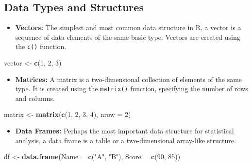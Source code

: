 \documentclass[
]{book}
\newenvironment{Shaded}{\begin{snugshade}}{\end{snugshade}}
\newcommand{\AttributeTok}[1]{\textcolor[rgb]{0.13,0.29,0.53}{#1}}
\newcommand{\DecValTok}[1]{\textcolor[rgb]{0.00,0.00,0.81}{#1}}
\newcommand{\FunctionTok}[1]{\textcolor[rgb]{0.13,0.29,0.53}{\textbf{#1}}}
\newcommand{\NormalTok}[1]{#1}
\newcommand{\OtherTok}[1]{\textcolor[rgb]{0.56,0.35,0.01}{#1}}
\newcommand{\StringTok}[1]{\textcolor[rgb]{0.31,0.60,0.02}{#1}}
\providecommand{\tightlist}{%
  \setlength{\itemsep}{0pt}\setlength{\parskip}{0pt}}
\begin{document}
\subsection*{Data Types and Structures}\label{data-types-and-structures}

\begin{itemize}
\tightlist
\item
  \textbf{Vectors:} The simplest and most common data structure in R, a vector is a sequence of data elements of the same basic type. Vectors are created using the \texttt{c()} function.
\end{itemize}

\begin{Shaded}
\begin{Highlighting}[]
\NormalTok{vector }\OtherTok{\textless{}{-}} \FunctionTok{c}\NormalTok{(}\DecValTok{1}\NormalTok{, }\DecValTok{2}\NormalTok{, }\DecValTok{3}\NormalTok{)}
\end{Highlighting}
\end{Shaded}

\begin{itemize}
\tightlist
\item
  \textbf{Matrices:} A matrix is a two-dimensional collection of elements of the same type. It is created using the \texttt{matrix()} function, specifying the number of rows and columns.
\end{itemize}

\begin{Shaded}
\begin{Highlighting}[]
\NormalTok{matrix }\OtherTok{\textless{}{-}} \FunctionTok{matrix}\NormalTok{(}\FunctionTok{c}\NormalTok{(}\DecValTok{1}\NormalTok{, }\DecValTok{2}\NormalTok{, }\DecValTok{3}\NormalTok{, }\DecValTok{4}\NormalTok{), }\AttributeTok{nrow =} \DecValTok{2}\NormalTok{)}
\end{Highlighting}
\end{Shaded}

\begin{itemize}
\tightlist
\item
  \textbf{Data Frames:} Perhaps the most important data structure for statistical analysis, a data frame is a table or a two-dimensional array-like structure.
\end{itemize}

\begin{Shaded}
\begin{Highlighting}[]
\NormalTok{df }\OtherTok{\textless{}{-}} \FunctionTok{data.frame}\NormalTok{(}\AttributeTok{Name =} \FunctionTok{c}\NormalTok{(}\StringTok{"A"}\NormalTok{, }\StringTok{"B"}\NormalTok{), }\AttributeTok{Score =} \FunctionTok{c}\NormalTok{(}\DecValTok{90}\NormalTok{, }\DecValTok{85}\NormalTok{))}
\end{Highlighting}
\end{Shaded}
\end{document}
